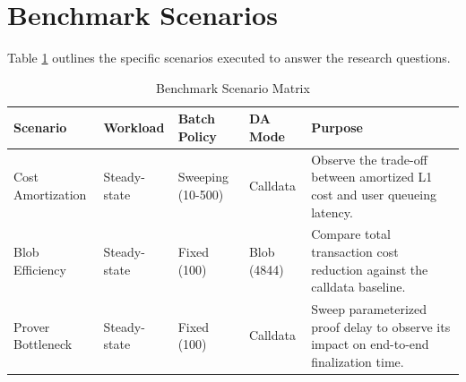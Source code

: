\section{Benchmark Scenarios}
\label{sec:experiment_scenarios}
Table \ref{tab:scenarios} outlines the specific scenarios executed to answer the research questions.

\begin{table}[H]
\centering
\caption{Benchmark Scenario Matrix}
\label{tab:scenarios}
\small
\begin{tabularx}{\textwidth}{l l l l X}
\toprule
\textbf{Scenario} & \textbf{Workload} & \textbf{Batch Policy} & \textbf{DA Mode} & \textbf{Purpose} \\
\midrule
Cost Amortization & Steady-state & Sweeping (10-500) & Calldata & Observe the trade-off between amortized L1 cost and user queueing latency. \\
\addlinespace
Blob Efficiency & Steady-state & Fixed (100) & Blob (4844) & Compare total transaction cost reduction against the calldata baseline. \\
\addlinespace
Prover Bottleneck & Steady-state & Fixed (100) & Calldata & Sweep parameterized proof delay to observe its impact on end-to-end finalization time. \\
\bottomrule
\end{tabularx}
\end{table}